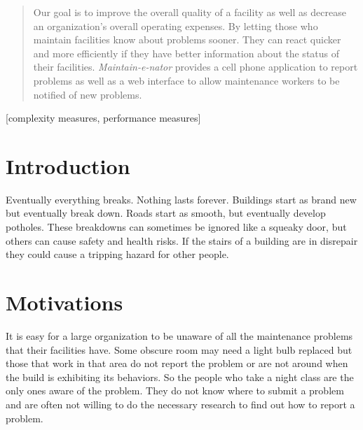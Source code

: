 \documentclass{acm_proc_article-sp}
\begin{document}
\maketitle

\begin{abstract}
Our goal is to improve the overall quality of a facility as well as decrease an organization's overall operating expenses. 
By letting those who maintain facilities know about problems sooner. They can react quicker and more efficiently if they have better information about the status of their facilities. 
\textit{Maintain-e-nator} provides a cell phone application to report problems as well as a web interface to 
allow maintenance workers to be notified of new problems.
\end{abstract}

[complexity measures, performance measures]


\section{Introduction}
Eventually everything breaks. Nothing lasts forever. Buildings start as brand new but eventually break down. 
Roads start as smooth, but eventually develop potholes. 
These breakdowns can sometimes be ignored like a squeaky door, but others can cause safety and health risks. 
If the stairs of a building are in disrepair they could cause a tripping hazard for other people.

\section{Motivations}
It is easy for a large organization to be unaware of all the maintenance problems that their facilities have. 
Some obscure room may need a light bulb replaced but those that work in that area do not report the problem or are not around when the build is exhibiting its behaviors. 
So the people who take a night class are the only ones aware of the problem. 
They do not know where to submit a problem and are often not willing to do the necessary research to find out how to report a problem.
\end{document}
